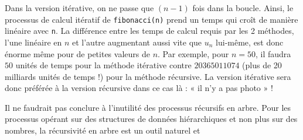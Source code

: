 Dans la version itérative, on ne passe que $(n-1)$ fois dans la boucle.
Ainsi, le processus de calcul itératif de {\tt fibonacci(n)}
prend un temps qui croît de manière linéaire avec {\tt n}.
La différence entre les temps de calcul requis par les 2 méthodes, 
l'une linéaire en $n$ et l'autre augmentant aussi vite que $u_n$ lui-même, 
est donc énorme même pour de petites valeurs de $n$. Par exemple, pour $n = 50$,
il faudra $50$ unités de temps pour la méthode itérative contre $20365011074$ 
(plus de 20 milliards unités de temps !)
pour la méthode récursive. La version itérative sera donc préférée 
à la version récursive dans ce cas là : « il n'y a pas photo » !

Il ne faudrait pas conclure à l'inutilité des processus récursifs en arbre. Pour
les processus opérant sur des structures de données hiérarchiques et non plus sur
des nombres, la récursivité en arbre est un outil naturel et 
